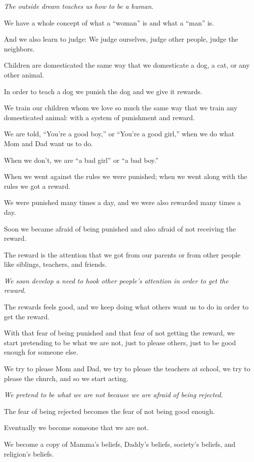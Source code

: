 \documentclass{article}
\numberwithin{equation}{section}
\begin{document}
\textit{The outside dream teaches us how to be a human}.

We have a whole concept of what a ``woman'' is and what a ``man'' is.

And we also learn to judge: We judge ourselves, judge other people, judge the neighbors.

%
Children are domesticated the same way that we domesticate a dog, a cat, or any other animal.

In order to teach a dog we punish the dog and we give it rewards.

We train our children whom we love so much the same way that we train any domesticated animal: with a system of punishment and reward.

We are told, ``You're a good boy,'' or ``You're a good girl,'' when we do what Mom and Dad want us to do.

When we don't, we are ``a bad girl'' or ``a bad boy.''

%
When we went against the rules we were punished; when we went along with the rules we got a reward.

We were punished many times a day, and we were also rewarded many times a day.

Soon we became afraid of being punished and also afraid of not receiving the reward.

The reward is the attention that we got from our parents or from other people like siblings, teachers, and friends.

\textit{We soon develop a need to hook other people's attention in order to get the reward}.

%
The rewards feels good, and we keep doing what others want us to do in order to get the reward.

With that fear of being punished and that fear of not getting the reward, we start pretending to be what we are not, just to please others, just to be good enough for someone else.

We try to please Mom and Dad, we try to please the teachers at school, we try to please the church, and so we start acting.

\textit{We pretend to be what we are not because we are afraid of being rejected}.

The fear of being rejected becomes the fear of not being good enough.

Eventually we become someone that we are not.

We become a copy of Mamma's beliefs, Daddy's beliefs, society's beliefs, and religion's beliefs.
\end{document}
